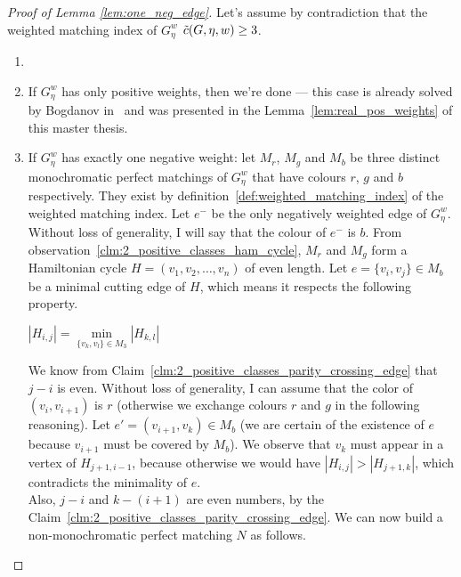 \begin{proof}[Proof of Lemma \ref{lem:one_neg_edge}]

    Let's assume by contradiction that the weighted matching index of $G_\eta^w$ $\Tilde{c}(G, \eta, w) \geq 3$.

    \begin{enumerate}
        \item[]

        \item If $G_\eta^w$ has only positive weights, then we're done — this case is already solved by Bogdanov in~\cite{bogdanov} and was presented in the Lemma~\ref{lem:real_pos_weights} of this master thesis.

        \item If $G_\eta^w$ has exactly one negative weight: let $M_r$, $M_g$ and $M_b$ be three distinct monochromatic perfect matchings of $G_\eta^w$ that have colours $r$, $g$ and $b$ respectively.
        They exist by definition~\ref{def:weighted_matching_index} of the weighted matching index.
        Let $e^-$ be the only negatively weighted edge of $G_\eta^w$.
        Without loss of generality, I will say that the colour of $e^-$ is $b$.
        From observation~\ref{clm:2_positive_classes_ham_cycle}, $M_r$ and $M_g$ form a Hamiltonian cycle $H = (v_1, v_2, \dots, v_n)$ of even length.
        Let $e = \{v_i, v_j\} \in M_b$ be a minimal cutting edge of $H$, which means it respects the following property.
        \begin{center}
            $\left| H_{i, j} \right| = \min\limits_{\{v_k, v_l\} \in M_3} \left| H_{k, l} \right|$
        \end{center}

        We know from Claim~\ref{clm:2_positive_classes_parity_crossing_edge} that $j-i$ is even.
        Without loss of generality, I can assume that the color of $(v_i, v_{i + 1})$ is $r$ (otherwise we exchange colours $r$ and $g$ in the following reasoning).
        Let $e' = (v_{i + 1}, v_k) \in M_b$ (we are certain of the existence of $e$ because $v_{i+1}$ must be covered by $M_b$).
        We observe that $v_k$ must appear in a vertex of $H_{j+1, i-1}$, because otherwise we would have $\left| H_{i, j} \right| > \left| H_{j+1, k} \right|$, which contradicts the minimality of $e$.\\

        Also, $j - i$ and $k - (i + 1)$ are even numbers, by the Claim~\ref{clm:2_positive_classes_parity_crossing_edge}.
        We can now build a non-monochromatic perfect matching $N$ as follows.


\end{enumerate}
\end{proof}
